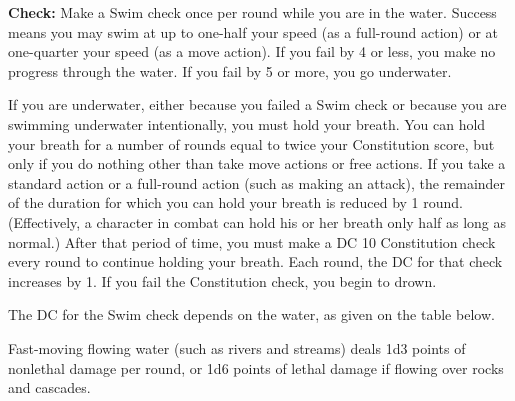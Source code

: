 \textbf{Check:} Make a Swim check once per round while you are in the water. Success means you may swim at up to one-half your speed (as a full-round action) or at one-quarter your speed (as a move action). If you fail by 4 or less, you make no progress through the water. If you fail by 5 or more, you go underwater.

If you are underwater, either because you failed a Swim check or because you are swimming underwater intentionally, you must hold your breath. You can hold your breath for a number of rounds equal to twice your Constitution score, but only if you do nothing other than take move actions or free actions. If you take a standard action or a full-round action (such as making an attack), the remainder of the duration for which you can hold your breath is reduced by 1 round. (Effectively, a character in combat can hold his or her breath only half as long as normal.) After that period of time, you must make a DC 10 Constitution check every round to continue holding your breath. Each round, the DC for that check increases by 1. If you fail the Constitution check, you begin to drown.

The DC for the Swim check depends on the water, as given on the table below.


Fast-moving flowing water (such as rivers and streams) deals 1d3 points of nonlethal damage per round, or 1d6 points of lethal damage if flowing over rocks and cascades.


